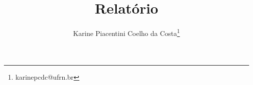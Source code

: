 \documentclass[12pt,openright]{report}
\title{\bf {Relatório}}
\author{Karine Piacentini Coelho da Costa\footnote{karinepcdc@ufrn.br}}%
\begin{document}
%
\maketitle


\newpage
{}
\tableofcontents

\newpage
%

\newpage









%


% 

\renewcommand{\baselinestretch}{1}
\normalsize

%
%
%
%
%
%
%
%
%
%
%
%
%

\renewcommand{\baselinestretch}{1.5}
\normalsize
\end{document}
